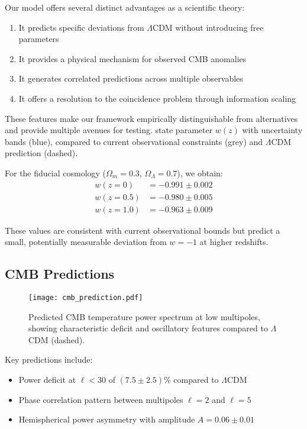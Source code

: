 \documentclass[12pt]{article}
\theoremstyle{plain}
\theoremstyle{definition}
\theoremstyle{remark}
\begin{document}
Our model offers several distinct advantages as a scientific theory:
\begin{enumerate}
\item It predicts specific deviations from $\Lambda$CDM without introducing free parameters
\item It provides a physical mechanism for observed CMB anomalies
\item It generates correlated predictions across multiple observables
\item It offers a resolution to the coincidence problem through information scaling
\end{enumerate}

These features make our framework empirically distinguishable from alternatives and provide multiple avenues for testing. state parameter $w(z)$ with uncertainty bands (blue), compared to current observational constraints (grey) and $\Lambda$CDM prediction (dashed).


For the fiducial cosmology ($\Omega_m = 0.3$, $\Omega_\Lambda = 0.7$), we obtain:
\begin{align}
w(z=0) &= -0.991 \pm 0.002 \\
w(z=0.5) &= -0.980 \pm 0.005 \\
w(z=1.0) &= -0.963 \pm 0.009
\end{align}

These values are consistent with current observational bounds but predict a small, potentially measurable deviation from $w = -1$ at higher redshifts.

\subsection{CMB Predictions}

\begin{figure}
\centering
\texttt{[image: cmb\_prediction.pdf]}
\caption{Predicted CMB temperature power spectrum at low multipoles, showing characteristic deficit and oscillatory features compared to $\Lambda$CDM (dashed).}
\end{figure}

Key predictions include:
\begin{itemize}
\item Power deficit at $\ell < 30$ of $(7.5 \pm 2.5)\%$ compared to $\Lambda$CDM
\item Phase correlation pattern between multipoles $\ell = 2$ and $\ell = 5$
\item Hemispherical power asymmetry with amplitude $A = 0.06 \pm 0.01$
\end{itemize}
\end{document}
